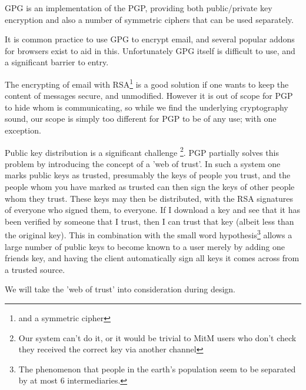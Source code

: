 GPG is an implementation of the PGP\cite{rfc4880}, providing both public/private
key encryption and also a number of symmetric ciphers that can be used
separately.

It is common practice to use GPG to encrypt email, and several popular addons
for browsers exist to aid in this\cite{gpgaddon}. Unfortunately GPG itself is
difficult to use\cite{greenwaldAnnoying}, and a significant barrier to entry.

The encrypting of email with RSA\footnote{and a symmetric cipher} is a good
solution if one wants to keep the content of messages secure, and unmodified.
However it is out of scope for PGP to hide whom is communicating, so while we
find the underlying cryptography sound, our scope is simply too different for
PGP to be of any use; with one exception.

Public key distribution is a significant challenge \footnote{Our system can't do
it, or it would be trivial to MitM users who don't check they received the
correct key via another channel}. PGP partially solves this problem by
introducing the concept of a 'web of trust'. In such a system one marks public
keys as trusted, presumably the keys of people you trust, and the people whom
you have marked as trusted can then sign the keys of other people whom they
trust. These keys may then be distributed, with the RSA signatures of everyone
who signed them, to everyone. If I download a key and see that it has been
verified by someone that I trust, then I can trust that key (albeit less than
the original key). This in combination with the small word hypothesis\footnote{
The phenomenon that people in the earth's population seem to be separated by at 
most 6 intermediaries.}\cite{sixdegrees} allows a large number of public keys to
become known to a user merely by adding one friends key, and having the client
automatically sign all keys it comes across from a trusted source.

We will take the 'web of trust' into consideration during design.
